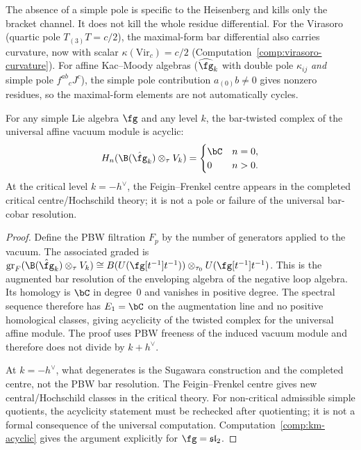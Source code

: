 \begin{remark}\label{rem:maximal-form-mechanism}
The absence of a simple pole is specific to the Heisenberg and kills
only the bracket channel. It does not kill the whole residue
differential. For the Virasoro
(quartic pole $T_{(3)}T = c/2$), the maximal-form bar differential
also carries curvature, now with scalar $\kappa(\mathrm{Vir}_c)=c/2$
(Computation~\ref{comp:virasoro-curvature}).
For affine Kac--Moody algebras ($\widehat{\fg}_k$ with double pole $\kappa_{ij}$
\emph{and} simple pole $f^{ab}{}_c J^c$), the simple pole contribution
$a_{(0)}b \neq 0$ gives nonzero residues, so the maximal-form
elements are not automatically cycles.
\end{remark}


\begin{proposition}
\label{prop:km-generic-acyclicity}
For any simple Lie algebra $\fg$ and any level $k$, the bar-twisted
complex of the universal affine vacuum module is acyclic:
\[
H_n(\B(\hat{\fg}_k) \otimes_\tau V_k) = \begin{cases}
\bC & n = 0, \\
0 & n > 0.
\end{cases}
\]
At the critical level $k = -h^\vee$, the Feigin--Frenkel centre appears
in the completed critical centre/Hochschild theory; it is not a pole or
failure of the universal bar-cobar resolution.
\end{proposition}

\begin{proof}
Define the PBW filtration $F_p$ by the number of generators applied
to the vacuum. The associated graded is
$\mathrm{gr}_F(\B(\hat{\fg}_k) \otimes_\tau V_k) \cong
B(U(\fg[t^{-1}]t^{-1})) \otimes_{\tau_0}
U(\fg[t^{-1}]t^{-1})$.
This is the augmented bar resolution of the enveloping algebra of
the negative loop algebra. Its homology is $\bC$ in degree~$0$ and
vanishes in positive degree. The spectral sequence therefore has
$E_1=\bC$ on the augmentation line and no positive homological
classes, giving acyclicity of the twisted complex for the universal
affine module. The proof uses PBW freeness of the induced vacuum
module and therefore does not divide by $k+h^\vee$.

At $k = -h^\vee$, what degenerates is the Sugawara construction and
the completed centre, not the PBW bar resolution. The
Feigin--Frenkel centre gives new central/Hochschild classes in the
critical theory. For non-critical admissible simple quotients, the
acyclicity statement must be rechecked after quotienting; it is not a
formal consequence of the universal computation. Computation~\ref{comp:km-acyclic}
gives the argument explicitly for $\fg = \mathfrak{sl}_2$.
\end{proof}


